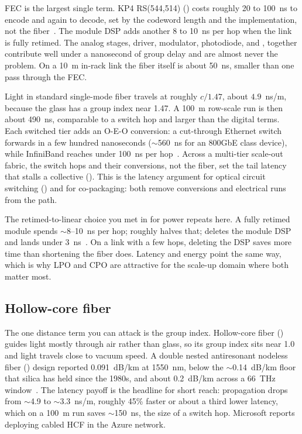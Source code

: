  FEC is the largest
single term. KP4 RS(544,514) () costs roughly 20 to 100~ns to encode
and again to decode, set by the codeword length and the implementation, not the
fiber~. The module DSP adds another 8 to 10~ns per hop when
the link is fully retimed. The analog stages, driver, modulator, photodiode, and
, together contribute well under a nanosecond of group delay and are
almost never the problem. On a 10~m in-rack link the fiber itself is about 50~ns,
smaller than one pass through the FEC.

 Light in
standard single-mode fiber travels at roughly $c/1.47$, about $4.9$~ns/m, because
the glass has a group index near 1.47. A 100~m row-scale run is then about 490~ns,
comparable to a switch hop and larger than the digital terms. Each switched tier
adds an O-E-O conversion: a cut-through Ethernet switch forwards in a few hundred
nanoseconds ($\sim$560~ns for an 800GbE class device), while InfiniBand reaches
under 100~ns per hop~. Across a multi-tier scale-out fabric,
the switch hops and their conversions, not the fiber, set the tail latency that
stalls a collective (). This is the latency
argument for optical circuit switching () and for co-packaging: both
remove conversions and electrical runs from the path.

 The
retimed-to-linear choice you met in  for power repeats here. A
fully retimed module spends $\sim$8--10~ns per hop;  roughly halves that;
 deletes the module DSP and lands under 3~ns~\cite{lpo}. On a link with a
few hops, deleting the DSP saves more time than shortening the fiber does. Latency
and energy point the same way, which is why LPO and CPO are attractive for the
scale-up domain where both matter most.

\subsection{Hollow-core fiber}
\label{sec:hcf}

The one distance term you can attack is the group index. Hollow-core fiber
() guides light mostly through air rather than glass, so its group index
sits near 1.0 and light travels close to vacuum speed. A double nested antiresonant
nodeless fiber () design reported 0.091~dB/km at 1550~nm, below the
$\sim$0.14~dB/km floor that silica has held since the 1980s, and about 0.2~dB/km
across a 66~THz window~. The latency payoff is the headline for
short reach: propagation drops from $\sim$4.9 to $\sim$3.3~ns/m, roughly 45\%
faster or about a third lower latency, which on a 100~m run saves $\sim$150~ns, the
size of a switch hop. Microsoft reports deploying cabled HCF in the Azure network.

